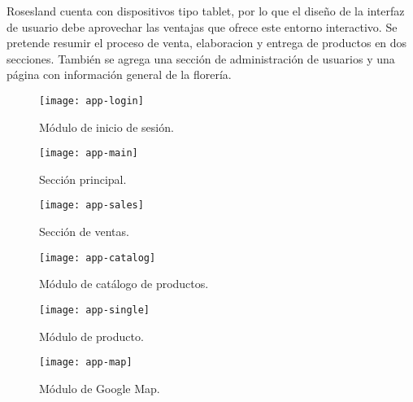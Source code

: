 Rosesland cuenta con dispositivos tipo tablet, por lo que el diseño de la interfaz de usuario debe aprovechar las ventajas que ofrece este entorno interactivo. Se pretende resumir el proceso de venta, elaboracion y entrega de productos en dos secciones. También se agrega una sección de administración de usuarios y una página con información general de la florería.
\vspace{0.8cm}



\begin{figure}[H]
  \centering
  \texttt{[image: app-login]}
  \caption{Módulo de inicio de sesión.}
\end{figure}
\vspace{0.8cm}

\begin{figure}[H]
  \centering
  \texttt{[image: app-main]}
  \caption{Sección principal.}
\end{figure}
\vspace{0.8cm}

\begin{figure}[H]
  \centering
  \texttt{[image: app-sales]}
  \caption{Sección de ventas.}
\end{figure}
\vspace{0.8cm}

\begin{figure}[H]
  \centering
  \texttt{[image: app-catalog]}
  \caption{Módulo de catálogo de productos.}
\end{figure}
\vspace{0.8cm}

\begin{figure}[H]
  \centering
  \texttt{[image: app-single]}
  \caption{Módulo de producto.}
\end{figure}
\vspace{0.8cm}

\begin{figure}[H]
  \centering
  \texttt{[image: app-map]}
  \caption{Módulo de Google Map.}
\end{figure}
\vspace{0.8cm}

